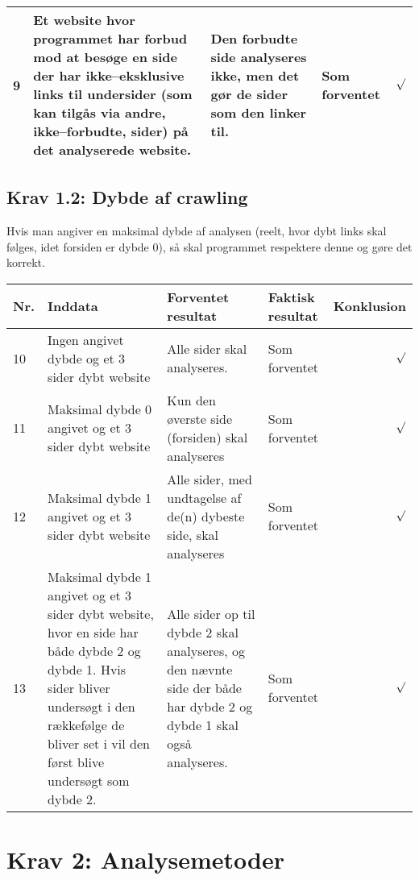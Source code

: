\documentclass[a4paper,oneside,article]{memoir}
\begin{document}
\begin{landscape}
\begin{longtable}[c]{p{20pt}|p{220pt}|p{130pt}|p{130pt}|r}
9 &
Et website hvor programmet har forbud mod at besøge en side der har
ikke--eksklusive links til undersider (som kan tilgås via andre,
ikke--forbudte, sider) på det analyserede website. &
Den forbudte side analyseres ikke, men det gør de sider som den linker
til. &
Som forventet &
$\surd$ \\ \hline

\end{longtable}

\subsection{Krav 1.2: Dybde af crawling}
Hvis man angiver en maksimal dybde af analysen (reelt, hvor dybt links
skal følges, idet forsiden er dybde 0), så skal programmet respektere
denne og gøre det korrekt.

\begin{longtable}[c]{p{20pt}|p{220pt}|p{130pt}|p{130pt}|r}
\textbf{Nr.} &
\textbf{Inddata} &
\textbf{Forventet resultat} &
\textbf{Faktisk resultat} &
\textbf{Konklusion} \\ \hline

10 &
Ingen angivet dybde og et 3 sider dybt website &
Alle sider skal analyseres. &
Som forventet &
$\surd$ \\ \hline

11 &
Maksimal dybde 0 angivet og et 3 sider dybt website &
Kun den øverste side (forsiden) skal analyseres &
Som forventet &
$\surd$ \\ \hline

12 &
Maksimal dybde 1 angivet og et 3 sider dybt website &
Alle sider, med undtagelse af de(n) dybeste side, skal analyseres &
Som forventet &
$\surd$ \\ \hline

13 &
Maksimal dybde 1 angivet og et 3 sider dybt website, hvor en side har
både dybde 2 og dybde 1. Hvis sider bliver undersøgt i den rækkefølge de
bliver set i vil den først blive undersøgt som dybde 2. &
Alle sider op til dybde 2 skal analyseres, og den nævnte side der både
har dybde 2 og dybde 1 skal også analyseres. &
Som forventet &
$\surd$ \\ \hline

\end{longtable}

\section{Krav 2: Analysemetoder}


\end{landscape}
\end{document}
